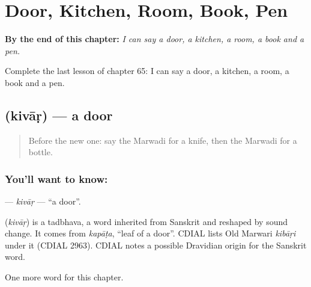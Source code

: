 
\chapter{Door, Kitchen, Room, Book, Pen}
\label{ch:mw-door-kitchen-room-book-pen}

\begin{chapteropening}
\textbf{By the end of this chapter:} \emph{I can say a door, a kitchen, a room, a book and a pen.}

Complete the last lesson of chapter 65: I can say a door, a kitchen, a room, a book and a pen.
\end{chapteropening}

\section[\texorpdfstring{\mw{किवाड़} (kivāṛ)}{किवाड़ (kivāṛ)}]{ (kivāṛ) — a door}

\label{lesson:MW-C65-kivar}



\begin{quote}
Before the new one: say the Marwadi for a knife, then the Marwadi for a bottle.
\end{quote}

\subsection*{You'll want to know: }
\textbf{} — \emph{kivāṛ} — \textquotedblleft{}a door\textquotedblright{}.

\begin{cousinweb}
\textbf{} (\emph{kivāṛ}) is a tadbhava, a word inherited from Sanskrit and reshaped by sound change. It comes from \emph{kapāṭa}, \textquotedblleft{}leaf of a door\textquotedblright{}. CDIAL lists Old Marwari \emph{kibāṛi} under it (CDIAL 2963). CDIAL notes a possible Dravidian origin for the Sanskrit word.
\end{cousinweb}

\begin{grammarlens}[title={What you've built}]
One more word for this chapter.
\end{grammarlens}

